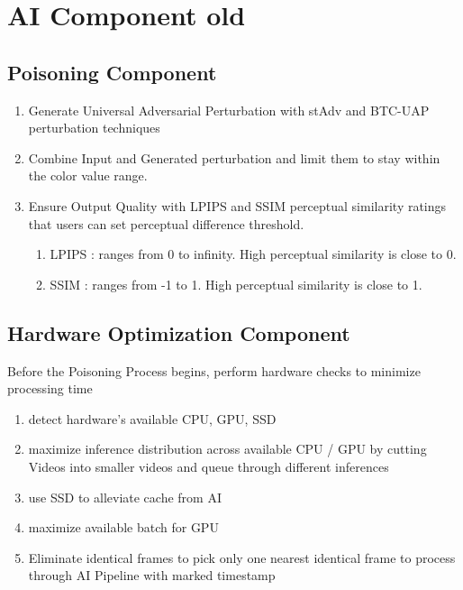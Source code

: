 \section{AI Component old}
\label{section:ai-component-old}

\subsection{Poisoning Component}
\label{subsection:poisoning-component}
\begin{enumerate}
    \item Generate Universal Adversarial Perturbation with stAdv and BTC-UAP perturbation techniques
    \item Combine Input and Generated perturbation and limit them to stay within the color value range.
    \item Ensure Output Quality with LPIPS and SSIM perceptual similarity ratings that users can set perceptual difference threshold.
    \begin{enumerate}
        \item LPIPS : ranges from 0 to infinity. High perceptual similarity is close to 0.
        \item SSIM : ranges from -1 to 1. High perceptual similarity is close to 1.
    \end{enumerate}
\end{enumerate}

\subsection{Hardware Optimization Component}
\label{subsection:hardware-optimization-component}
Before the Poisoning Process begins, perform hardware checks to minimize processing time
\begin{enumerate}
    \item detect hardware’s available CPU, GPU, SSD
    \item maximize inference distribution across available CPU / GPU by cutting Videos into smaller videos and queue through different inferences
    \item use SSD to alleviate cache from AI
    \item maximize available batch for GPU
    \item Eliminate identical frames to pick only one nearest identical frame to process through AI Pipeline with marked timestamp
\end{enumerate}
